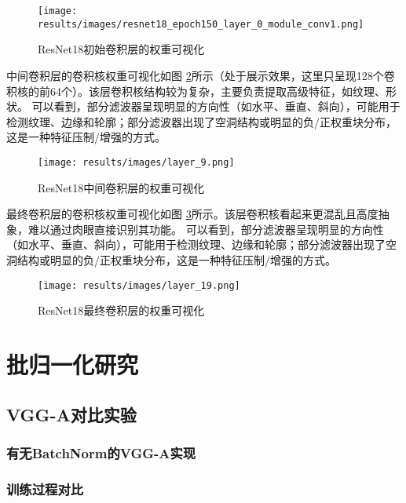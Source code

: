 \documentclass[12pt,a4paper]{article}
\begin{document}
\begin{figure}[htbp]
    \centering
    \texttt{[image: results/images/resnet18\_epoch150\_layer\_0\_module\_conv1.png]}
    \caption{ResNet18初始卷积层的权重可视化}
    \label{fig:layer0}
\end{figure}

中间卷积层的卷积核权重可视化如图 \ref{fig:layer9}所示（处于展示效果，这里只呈现128个卷积核的前64个）。该层卷积核结构较为复杂，主要负责提取高级特征，如纹理、形状。
可以看到，部分滤波器呈现明显的方向性（如水平、垂直、斜向），可能用于检测纹理、边缘和轮廓；部分滤波器出现了空洞结构或明显的负/正权重块分布，这是一种特征压制/增强的方式。

\begin{figure}[htbp]
    \centering
    \texttt{[image: results/images/layer\_9.png]}
    \caption{ResNet18中间卷积层的权重可视化}
    \label{fig:layer9}
\end{figure}

最终卷积层的卷积核权重可视化如图 \ref{fig:layer19}所示。该层卷积核看起来更混乱且高度抽象，难以通过肉眼直接识别其功能。
可以看到，部分滤波器呈现明显的方向性（如水平、垂直、斜向），可能用于检测纹理、边缘和轮廓；部分滤波器出现了空洞结构或明显的负/正权重块分布，这是一种特征压制/增强的方式。

\begin{figure}[htbp]
    \centering
    \texttt{[image: results/images/layer\_19.png]}
    \caption{ResNet18最终卷积层的权重可视化}
    \label{fig:layer19}
\end{figure}

\section{批归一化研究}

\subsection{VGG-A对比实验}
\subsubsection{有无BatchNorm的VGG-A实现}

\subsubsection{训练过程对比}
\end{document}
